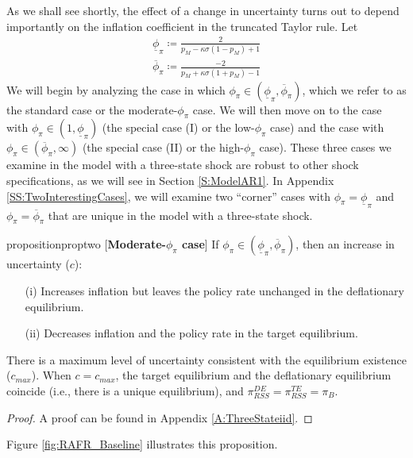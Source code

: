 \documentclass[11pt]{article}
\newtheorem{definition}{Definition}
\begin{document}
	As we shall see shortly, the effect of a change in uncertainty turns out to depend importantly on the inflation coefficient in the truncated Taylor rule.
	Let
	\begin{align*}
	\underline{\phi}_{\pi} \coloneqq \frac{2}{p_M - \kappa\sigma(1-p_M) + 1}\\
	\overline{\phi}_{\pi} \coloneqq \frac{-2}{p_M + \kappa\sigma(1+p_M) - 1}
	\end{align*}
	We will begin by analyzing the case in which $\phi_{\pi}\in(\underline{\phi}_{\pi},\overline{\phi}_{\pi})$, which we refer to as the standard case or the moderate-$\phi_{\pi}$ case. We will then move on to the case with $\phi_{\pi}\in(1,\underline{\phi}_{\pi})$ (the special case (I) or the low-$\phi_{\pi}$ case) and the case with $\phi_{\pi}\in(\overline{\phi}_{\pi},\infty)$ (the special case (II) or the high-$\phi_{\pi}$ case). These three cases we examine in the model with a three-state shock are robust to other shock specifications, as we will see in Section \ref{S:ModelAR1}. In Appendix \ref{SS:TwoInterestingCases}, we will examine two ``corner'' cases with $\phi_{\pi}=\underline{\phi}_{\pi}$ and $\phi_{\pi}=\overline{\phi}_{\pi}$ that are unique in the model with a three-state shock.
	
	
	\begin{restatable}{proposition}{proptwo}\label{prop:prop2}
		[\textbf{Moderate-$\phi_{\pi}$ case}] If $\phi_{\pi}\in(\underline{\phi}_{\pi},\overline{\phi}_{\pi})$, then an increase in uncertainty ($c$):
		\begin{itemize}
			\item[(i)]  Increases inflation but leaves the policy rate unchanged in the deflationary equilibrium.
			\item[(ii)] Decreases inflation and the policy rate in the target equilibrium.
		\end{itemize}
		There is a maximum level of uncertainty consistent with the equilibrium existence ($c_{max}$). When $c=c_{max}$, the target equilibrium and the deflationary equilibrium coincide (i.e., there is a unique equilibrium), and $\pi_{RSS}^{DE} = \pi_{RSS}^{TE} = \pi_{B}$. 
	\end{restatable}
	\begin{proof}
		A proof can be found in Appendix \ref{A:ThreeStateiid}.
	\end{proof}
	Figure \ref{fig:RAFR_Baseline} illustrates this proposition.
	
\end{document}
